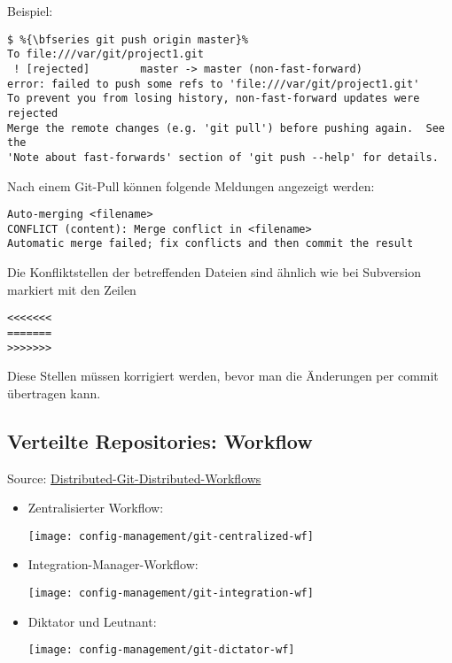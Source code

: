 Beispiel:
\begin{lstlisting}[escapechar=\%]
$ %{\bfseries git push origin master}%
To file:///var/git/project1.git
 ! [rejected]        master -> master (non-fast-forward)
error: failed to push some refs to 'file:///var/git/project1.git'
To prevent you from losing history, non-fast-forward updates were rejected
Merge the remote changes (e.g. 'git pull') before pushing again.  See the
'Note about fast-forwards' section of 'git push --help' for details.
\end{lstlisting}
\newslide
Nach einem Git-Pull können folgende Meldungen angezeigt werden:
\begin{lstlisting}
Auto-merging <filename>
CONFLICT (content): Merge conflict in <filename>
Automatic merge failed; fix conflicts and then commit the result
\end{lstlisting}
Die Konfliktstellen der betreffenden Dateien sind
ähnlich wie bei Subversion markiert mit den Zeilen
\begin{lstlisting}
<<<<<<<
=======
>>>>>>>
\end{lstlisting}
Diese Stellen müssen korrigiert werden, bevor man die Änderungen per
commit übertragen kann.
%
\newslide
\subsection{Verteilte Repositories: Workflow}
Source: \href{http://git-scm.com/book/en/Distributed-Git-Distributed-Workflows}
  {Distributed-Git-Distributed-Workflows}
\begin{itemize}
\item Zentralisierter Workflow:
\begin{center}
\texttt{[image: config-management/git-centralized-wf]}
\end{center}
\newslide
\item Integration-Manager-Workflow:
\begin{center}
\texttt{[image: config-management/git-integration-wf]}
\end{center}
\newslide
\item Diktator und Leutnant:
\begin{center}
\texttt{[image: config-management/git-dictator-wf]}
\end{center}
\end{itemize}
\newslide
